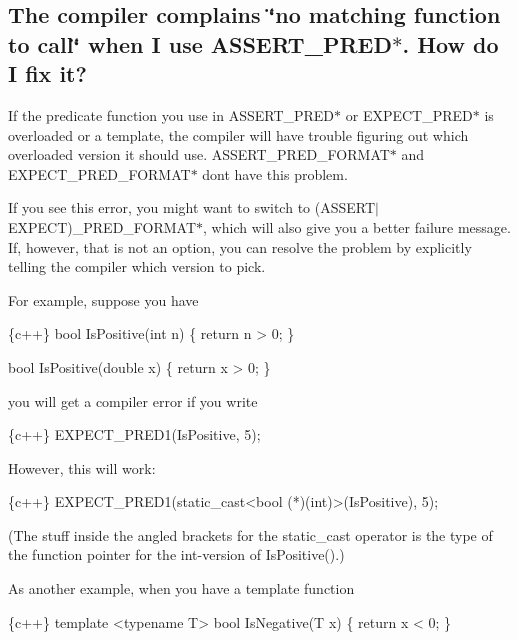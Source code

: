 \subsection*{The compiler complains \char`\"{}no matching function to call\char`\"{} when I use A\+S\+S\+E\+R\+T\+\_\+\+P\+R\+E\+D$\ast$. How do I fix it?}

If the predicate function you use in {\ttfamily A\+S\+S\+E\+R\+T\+\_\+\+P\+R\+E\+D$\ast$} or {\ttfamily E\+X\+P\+E\+C\+T\+\_\+\+P\+R\+E\+D$\ast$} is overloaded or a template, the compiler will have trouble figuring out which overloaded version it should use. {\ttfamily A\+S\+S\+E\+R\+T\+\_\+\+P\+R\+E\+D\+\_\+\+F\+O\+R\+M\+A\+T$\ast$} and {\ttfamily E\+X\+P\+E\+C\+T\+\_\+\+P\+R\+E\+D\+\_\+\+F\+O\+R\+M\+A\+T$\ast$} don\textquotesingle{}t have this problem.

If you see this error, you might want to switch to {\ttfamily (A\+S\+S\+E\+R\+T$\vert$\+E\+X\+P\+E\+CT)\+\_\+\+P\+R\+E\+D\+\_\+\+F\+O\+R\+M\+A\+T$\ast$}, which will also give you a better failure message. If, however, that is not an option, you can resolve the problem by explicitly telling the compiler which version to pick.

For example, suppose you have


\begin{DoxyCode}
\{c++\}
bool IsPositive(int n) \{
  return n > 0;
\}

bool IsPositive(double x) \{
  return x > 0;
\}
\end{DoxyCode}


you will get a compiler error if you write


\begin{DoxyCode}
\{c++\}
EXPECT\_PRED1(IsPositive, 5);
\end{DoxyCode}


However, this will work\+:


\begin{DoxyCode}
\{c++\}
EXPECT\_PRED1(static\_cast<bool (*)(int)>(IsPositive), 5);
\end{DoxyCode}


(The stuff inside the angled brackets for the {\ttfamily static\+\_\+cast} operator is the type of the function pointer for the {\ttfamily int}-\/version of {\ttfamily Is\+Positive()}.)

As another example, when you have a template function


\begin{DoxyCode}
\{c++\}
template <typename T>
bool IsNegative(T x) \{
  return x < 0;
\}
\end{DoxyCode}



